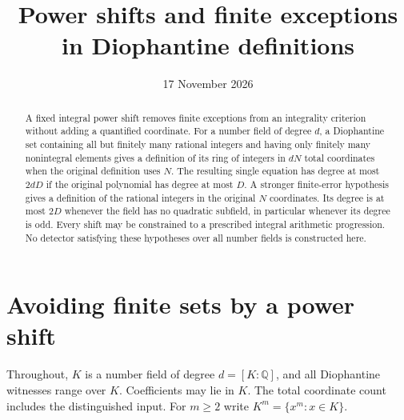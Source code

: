 \documentclass[11pt,a4paper]{article}
\title{Power shifts and finite exceptions in Diophantine definitions}
\author{}\date{17 November 2026}
\newcommand{\Q}{\mathbb Q}\newcommand{\Z}{\mathbb Z}
\begin{document}
\maketitle
\begin{abstract}
A fixed integral power shift removes finite exceptions from an
integrality criterion without adding a quantified coordinate.
For a number field of degree $d$, a Diophantine set containing all
but finitely many rational integers and having only finitely many
nonintegral elements gives a definition of its ring of integers in
$dN$ total coordinates when the original definition uses $N$.
The resulting single equation has degree at most $2dD$ if the
original polynomial has degree at most $D$. A stronger finite-error
hypothesis gives a definition of the rational integers in the
original $N$ coordinates. Its degree is at most $2D$ whenever
the field has no quadratic subfield, in particular whenever its
degree is odd. Every shift may be constrained to a
prescribed integral arithmetic progression. No detector satisfying
these hypotheses over all number fields is constructed here.
\end{abstract}

\section{Avoiding finite sets by a power shift}
Throughout, $K$ is a number field of degree $d=[K:\Q]$, and all
Diophantine witnesses range over $K$. Coefficients may lie in $K$.
The total coordinate count includes the distinguished input.
For $m\ge2$ write $K^m=\{x^m:x\in K\}$.
\end{document}
